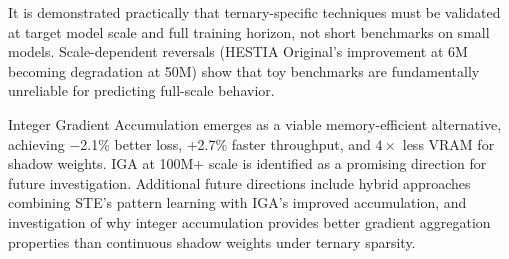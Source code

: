 \documentclass{article}
\begin{document}
It is demonstrated practically that ternary-specific techniques must be validated at target model scale and full training horizon, not short benchmarks on small models. Scale-dependent reversals (HESTIA Original's improvement at 6M becoming degradation at 50M) show that toy benchmarks are fundamentally unreliable for predicting full-scale behavior.

Integer Gradient Accumulation emerges as a viable memory-efficient alternative, achieving $-$2.1\% better loss, $+$2.7\% faster throughput, and $4\times$ less VRAM for shadow weights. IGA at 100M+ scale is identified as a promising direction for future investigation. Additional future directions include hybrid approaches combining STE's pattern learning with IGA's improved accumulation, and investigation of why integer accumulation provides better gradient aggregation properties than continuous shadow weights under ternary sparsity.



\end{document}
